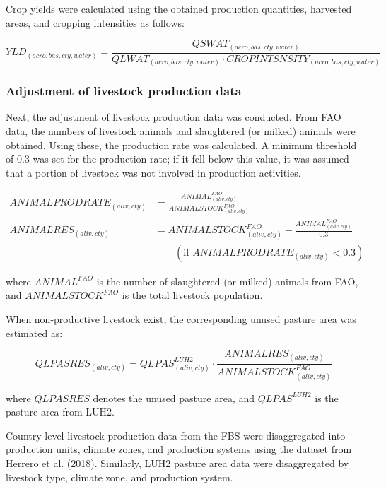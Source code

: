 Crop yields were calculated using the obtained production quantities, harvested areas, 
and cropping intensities as follows:

\begin{equation}
YLD_{(acro,bas,cty,water)} = 
\frac{QSWAT_{(acro,bas,cty,water)}}{QLWAT_{(acro,bas,cty,water)} \cdot CROPINTSNSITY_{(acro,bas,cty,water)}}
\end{equation}


\subsubsection{Adjustment of livestock production data}

Next, the adjustment of livestock production data was conducted. 
From FAO data, the numbers of livestock animals and slaughtered (or milked) animals were obtained. 
Using these, the production rate was calculated. 
A minimum threshold of 0.3 was set for the production rate; if it fell below this value, 
it was assumed that a portion of livestock was not involved in production activities.

\begin{align}
ANIMALPRODRATE_{(aliv,cty)} &= 
\frac{ANIMAL^{FAO}_{(aliv,cty)}}{ANIMALSTOCK^{FAO}_{(aliv,cty)}} \\
ANIMALRES_{(aliv,cty)} &= 
ANIMALSTOCK^{FAO}_{(aliv,cty)} - 
\frac{ANIMAL^{FAO}_{(aliv,cty)}}{0.3} 
\nonumber\\[-0.3em]
&\quad
\quad (\text{if } ANIMALPRODRATE_{(aliv,cty)} < 0.3) 
\end{align}

where \( ANIMAL^{FAO} \) is the number of slaughtered (or milked) animals from FAO, 
and \( ANIMALSTOCK^{FAO} \) is the total livestock population.

When non-productive livestock exist, the corresponding unused pasture area was estimated as:

\begin{equation}
QLPASRES_{(aliv,cty)} = 
QLPAS^{LUH2}_{(aliv,cty)} \cdot 
\frac{ANIMALRES_{(aliv,cty)}}{ANIMALSTOCK^{FAO}_{(aliv,cty)}}
\end{equation}

where \( QLPASRES \) denotes the unused pasture area, 
and \( QLPAS^{LUH2} \) is the pasture area from LUH2.

Country-level livestock production data from the FBS were disaggregated 
into production units, climate zones, and production systems 
using the dataset from Herrero et al. (2018). 
Similarly, LUH2 pasture area data were disaggregated by livestock type, 
climate zone, and production system.


